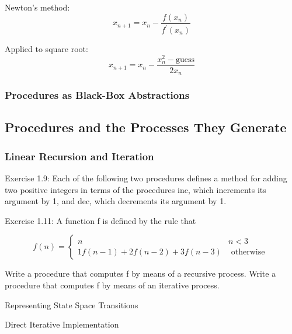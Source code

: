 Newton's method:
\begin{equation}
x_{n+1} = x_{n} - \frac{f\left(x_n\right)}{f^{'}\left(x_n\right)}
\label{eq:newtons}
\end{equation}

Applied to square root:
\begin{equation}
x_{n+1} 
= x_{n} - \frac{x^2_n - \mbox{guess}}{2 x_n}
\label{eq:newtons_sqrt}
\end{equation}

            \subsubsection{Procedures as Black-Box Abstractions}
        \subsection{Procedures and the Processes They Generate}
            \subsubsection{Linear Recursion and Iteration}
Exercise 1.9: Each of the following two procedures defines a method for adding two positive integers in terms of the procedures inc, which increments its argument by 1, and dec, which decrements its argument by 1.
\newline

Exercise 1.11: A function f is defined by the rule that 

\begin{equation}
f\left(n\right) = 
\begin{cases}
n & n < 3 \\
1 f\left(n-1\right) + 2 f\left(n-2\right) + 3 f\left(n-3\right) & \mbox{ otherwise }
\end{cases}
\label{eq:ss_recursive}
\end{equation}

Write a procedure that computes f by means of a recursive process. Write a procedure that computes f by means of an iterative process.
\newline

Representing State Space Transitions
\newline

Direct Iterative Implementation
\newline


